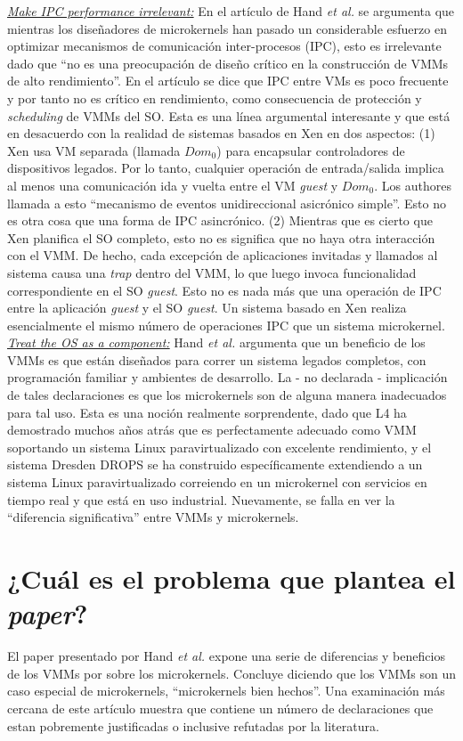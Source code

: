 \underline{\emph{Make IPC performance irrelevant:}} En el artículo de Hand \emph{et al.} se argumenta que mientras los diseñadores de microkernels han pasado un considerable esfuerzo en optimizar mecanismos de comunicación inter-procesos (IPC), esto es irrelevante dado que ``no es una preocupación de diseño crítico en la construcción de VMMs de alto rendimiento''. En el artículo se dice que IPC entre VMs es poco frecuente y por tanto no es crítico en rendimiento, como consecuencia de protección y \emph{scheduling} de VMMs del SO. Esta es una línea argumental interesante y que está en desacuerdo con la realidad de sistemas basados en Xen en dos aspectos: (1) Xen usa VM separada (llamada $Dom_0$) para encapsular controladores de dispositivos legados. Por lo tanto, cualquier operación de entrada/salida implica al menos una comunicación ida y vuelta entre el VM \emph{guest} y $Dom_0$. Los authores llamada a esto ``mecanismo de eventos unidireccional asicrónico simple''. Esto no es otra cosa que una forma de IPC asincrónico. (2) Mientras que es cierto que Xen planifica el SO completo, esto no es significa que no haya otra interacción con el VMM. De hecho, cada excepción de aplicaciones invitadas y llamados al sistema causa una \emph{trap} dentro del VMM, lo que luego invoca funcionalidad correspondiente en el SO \emph{guest}. Esto no es nada más que una operación de IPC entre la aplicación \emph{guest} y el SO \emph{guest}. Un sistema basado en Xen realiza esencialmente el mismo número de operaciones IPC que un sistema microkernel. \underline{\emph{Treat the OS as a component:}} Hand \emph{et al.} argumenta que un beneficio de los VMMs es que están diseñados para correr un sistema legados completos, con programación familiar y ambientes de desarrollo. La - no declarada - implicación de tales declaraciones es que los microkernels son de alguna manera inadecuados para tal uso. Esta es una noción realmente sorprendente, dado que L4 ha demostrado muchos años atrás que es perfectamente adecuado como VMM soportando un sistema Linux paravirtualizado con excelente rendimiento, y el sistema Dresden DROPS se ha construido específicamente extendiendo a un sistema Linux paravirtualizado correiendo en un microkernel con servicios en tiempo real y que está en uso industrial. Nuevamente, se falla en ver la ``diferencia significativa'' entre VMMs y microkernels.


\section{¿Cuál es el problema que plantea el \textit{paper}?}
El paper presentado por Hand \emph{et al.} expone una serie de diferencias y beneficios de los VMMs por sobre los microkernels. Concluye diciendo que los VMMs son un caso especial de microkernels, ``microkernels bien hechos''. Una examinación más cercana de este artículo muestra que contiene un número de declaraciones que estan pobremente justificadas o inclusive refutadas por la literatura.

